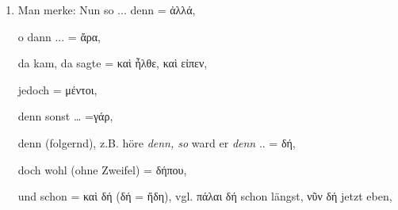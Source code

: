 \begin{enumerate}[leftmargin=0pt,rightmargin=0pt,listparindent =1cm,labelindent=1cm,labelsep=1ex,labelwidth={*},itemindent={*},align=left]
In ununterbrochener Rede ist \emph{jeder neue Satz} durch eine passende
Conjunction (\textgreek[variant=ancient]{δέ, καί οὖν, γάρ} etc.) an
das Voraus\textcompwordmark{}gehende \emph{anzuschließen.}


Der Lernende ist davor zu warnen, \textgreek[variant=ancient]{μέν}
für eine diese Verbin- dung mit dem \emph{Voraus\textcompwordmark{}gehenden}
ersetzende Conjunction zu halten, da es nur zum Hinweis auf das \emph{Folgende}
dient.


Anfügung ohne Bindewort ist in ununterbrochener Rede nur gestattet:
\begin{enumerate}
\item an den Stellen, wo wir im Deutschen den Doppelpunkt als Interpunctions\textcompwordmark{}zeichen
setzen;
\item wenn der neue Satz mit stark betontem Demonstrativum oder
\item wenn der neue Satz mit \textgreek[variant=ancient]{εἶτα} (= und dann)
oder \textgreek[variant=ancient]{ἔπειτα} beginnt;
\item wo wir im Deutschen mit \emph{\quotedblbase nicht aber``} fortsahren;
es steht dann häufig bloßes \textgreek[variant=ancient]{οὐ} (beziehentlich
\textgreek[variant=ancient]{μή}\,), (weil \textgreek[variant=ancient]{οὐ}
mit \textgreek[variant=ancient]{δέ} \quotedblbase und nicht`` oder
\quotedblbase nicht einmal`` bedeutet), oft jedoch auch \textgreek[variant=ancient]{οὐ
μέντοι.} 
\end{enumerate}
\item Man merke: Nun so ... denn = \textgreek[variant=ancient]{ἀλλά,}


\bgroup\addtolength{\leftskip}{\parindent}\addtolength{\leftskip}{3em}\setlength{\parindent}{-1em}\setlength{\arraycolsep}{0pt}o
dann ... = \textgreek[variant=ancient]{ἄρα,}


da kam, da sagte = \textgreek[variant=ancient]{καὶ ἦλθε, καὶ εἰπεν,}


jedoch = \textgreek[variant=ancient]{μέντοι,}


denn sonst \ldots{} =\textgreek[variant=ancient]{γάρ,}


denn (folgernd), z.B. höre \emph{denn, so} ward er \emph{denn} ..
= \textgreek[variant=ancient]{δή,}


doch wohl (ohne Zweifel) = \textgreek[variant=ancient]{δήπου,}


und schon = \textgreek[variant=ancient]{καὶ δή} (\textgreek[variant=ancient]{δή}
= \textgreek[variant=ancient]{ἤδη}), vgl. \textgreek[variant=ancient]{πάλαι
δή} schon längst, \textgreek[variant=ancient]{νῦν δή} jetzt eben,



\end{enumerate}
